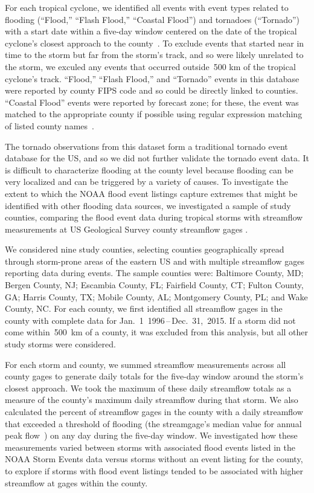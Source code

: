 For each tropical cyclone, we identified all events with event types related to
flooding (``Flood,'' ``Flash Flood,'' ``Coastal Flood'') and tornadoes
(``Tornado'') with a start date within a five-day window centered on the date
of the tropical cyclone's closest approach to the
county~\parencite{hurricaneexposuredata}. To exclude events that started near
in time to the storm but far from the storm's track, and so were likely
unrelated to the storm, we exculed any events that occurred outside~500
\si{\kilo\metre} of the tropical cyclone's track. ``Flood,'' ``Flash Flood,''
and ``Tornado'' events in this database were reported by county \ac{FIPS} code
and so could be directly linked to counties.  ``Coastal Flood'' events were
reported by forecast zone; for these, the event was matched to the appropriate
county if possible using regular expression matching of listed county
names~\parencite{noaastormevents}. 

The tornado observations from this dataset form a traditional tornado event
database for the \ac{US}, and so we did not further validate
the tornado event data. It is difficult to characterize flooding at the county
level because flooding can be very localized and can be triggered by a variety
of causes. To investigate the extent to which the NOAA flood event listings
capture extremes that might be identified with other flooding data sources, we
investigated a sample of study counties, comparing the flood event data during
tropical storms with streamflow measurements at \ac{US} Geological Survey
county streamflow gages \parencite{usgsgages, countyfloods, dataRetrieval}.  

We considered nine study counties, selecting counties geographically spread
through storm-prone areas of the eastern \ac{US} and with multiple streamflow
gages reporting data during events. The sample counties were: Baltimore County,
MD; Bergen County, NJ; Escambia County, FL; Fairfield County, CT; Fulton
County, GA; Harris County, TX; Mobile County, AL; Montgomery County, PL; and
Wake County, NC. For each county, we first identified all streamflow gages in
the county with complete data for Jan.~1~1996\,--\,Dec.~31,~2015. If a storm
did not come within~500~\si{\kilo\metre} of a county, it was excluded from this
analysis, but all other study storms were considered. 

For each storm and county, we summed streamflow measurements across all county
gages to generate daily totals for the five-day window around the storm's
closest approach. We took the maximum of these daily streamflow totals as a
measure of the county's maximum daily streamflow during that storm. We also
calculated the percent of streamflow gages in the county with a daily
streamflow that exceeded a threshold of flooding (the streamgage's median value
for annual peak flow~\parencite{countyfloods}) on any day during the five-day
window. We investigated how these measurements varied between storms with
associated flood events listed in the NOAA Storm Events data versus storms without an
event listing for the county, to explore if storms with flood event listings
tended to be associated with higher streamflow at gages within the county.

